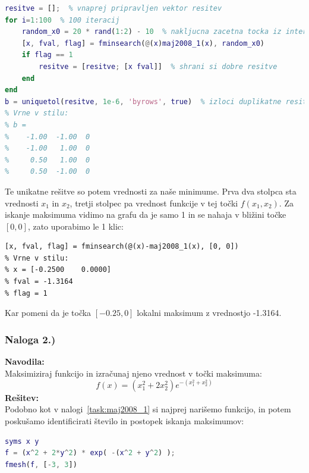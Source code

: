 \documentclass[a4paper,11pt]{article}
\begin{document}
\begin{lstlisting}[language=Matlab]
resitve = [];  % vnaprej pripravljen vektor resitev
for i=1:100  % 100 iteracij
	random_x0 = 20 * rand(1:2) - 10  % nakljucna zacetna tocka iz intervala [-10, 10]
	[x, fval, flag] = fminsearch(@(x)maj2008_1(x), random_x0)
	if flag == 1
		resitve = [resitve; [x fval]]  % shrani si dobre resitve
	end
end
b = uniquetol(resitve, 1e-6, 'byrows', true)  % izloci duplikatne resitve
% Vrne v stilu:
% b = 
%    -1.00  -1.00  0
%    -1.00   1.00  0
%     0.50   1.00  0
%     0.50  -1.00  0
\end{lstlisting}
Te unikatne rešitve so potem vrednosti za naše minimume. Prva dva stolpca sta vrednosti $x_1$ in $x_2$, tretji stolpec pa vrednost funkcije v tej točki $f(x_1, x_2)$.
Za iskanje maksimuma vidimo na grafu da je samo 1 in se nahaja v bližini točke $[0, 0]$, zato uporabimo le 1 klic:

\begin{lstlisting}
[x, fval, flag] = fminsearch(@(x)-maj2008_1(x), [0, 0])
% Vrne v stilu:
% x = [-0.2500    0.0000]
% fval = -1.3164
% flag = 1
\end{lstlisting}
Kar pomeni da je točka $[-0.25, 0]$ lokalni maksimum z vrednostjo -1.3164.


\subsubsection{Naloga 2.)}
\label{task:maj2008_2}

\textbf{Navodila:} \\
Maksimiziraj funkcijo in izračunaj njeno vrednost v točki maksimuma:
\begin{equation} \label{eq:maj2008_2}
f(x) = (x_1^2 + 2x_2^2)e^{-(x_1^2 + x_2^2)}
\end{equation}
\textbf{Rešitev:} \\
Podobno kot v nalogi~\ref{task:maj2008_1} si najprej narišemo funkcijo, in potem poskušamo identificirati število in postopek iskanja maksimumov:

\begin{lstlisting}[language=Matlab]
syms x y
f = (x^2 + 2*y^2) * exp( -(x^2 + y^2) );
fmesh(f, [-3, 3])
\end{lstlisting}
\end{document}
